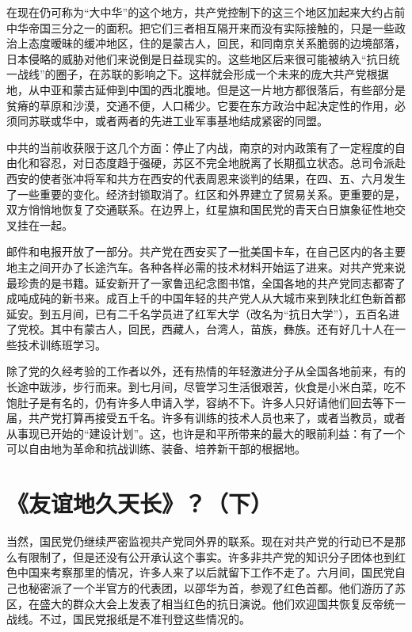 \documentclass[10pt]{book}
\begin{document}
在现在仍可称为“大中华”的这个地方，共产党控制下的这三个地区加起来大约占前中华帝国三分之一的面积。把它们三者相互隔开来而没有实际接触的，只是一些政治上态度暧昧的缓冲地区，住的是蒙古人，回民，和同南京关系脆弱的边境部落，日本侵略的威胁对他们来说倒是日益现实的。这些地区后来很可能被纳入“抗日统一战线”的圈子，在苏联的影响之下。这样就会形成一个未来的庞大共产党根据地，从中亚和蒙古延伸到中国的西北腹地。但是这一片地方都很落后，有些部分是贫瘠的草原和沙漠，交通不便，人口稀少。它要在东方政治中起决定性的作用，必须同苏联或华中，或者两者的先进工业军事基地结成紧密的同盟。

中共的当前收获限于这几个方面：停止了内战，南京的对内政策有了一定程度的自由化和容忍，对日态度趋于强硬，苏区不完全地脱离了长期孤立状态。总司令派赴西安的使者张冲将军和共方在西安的代表周恩来谈判的结果，在四、五、六月发生了一些重要的变化。经济封锁取消了。红区和外界建立了贸易关系。更重要的是，双方悄悄地恢复了交通联系。在边界上，红星旗和国民党的青天白日旗象征性地交叉挂在一起。

邮件和电报开放了一部分。共产党在西安买了一批美国卡车，在自己区内的各主要地主之间开办了长途汽车。各种各样必需的技术材料开始运了进来。对共产党来说最珍贵的是书籍。延安新开了一家鲁迅纪念图书馆，全国各地的共产党同志都寄了成吨成砘的新书来。成百上千的中国年轻的共产党人从大城市来到陕北红色新首都延安。到五月间，已有二千名学员进了红军大学（改名为“抗日大学”），五百名进了党校。其中有蒙古人，回民，西藏人，台湾人，苗族，彝族。还有好几十人在一些技术训练班学习。

除了党的久经考验的工作者以外，还有热情的年轻激进分子从全国各地前来，有的长途中跋涉，步行而来。到七月间，尽管学习生活很艰苦，伙食是小米白菜，吃不饱肚子是有名的，仍有许多人申请入学，容纳不下。许多人只好请他们回去等下一届，共产党打算再接受五千名。许多有训练的技术人员也来了，或者当教员，或者从事现已开始的“建设计划”。这，也许是和平所带来的最大的眼前利益：有了一个可以自由地为革命和抗战训练、装备、培养新干部的根据地。



\section{《友谊地久天长》？（下）}

当然，国民党仍继续严密监视共产党同外界的联系。现在对共产党的行动已不是那么有限制了，但是还没有公开承认这个事实。许多非共产党的知识分子团体也到红色中国来考察那里的情况，许多人来了以后就留下工作不走了。六月间，国民党自己也秘密派了一个半官方的代表团，以邵华为首，参观了红色首都。他们游历了苏区，在盛大的群众大会上发表了相当红色的抗日演说。他们欢迎国共恢复反帝统一战线。不过，国民党报纸是不准刊登这些情况的。
\end{document}
